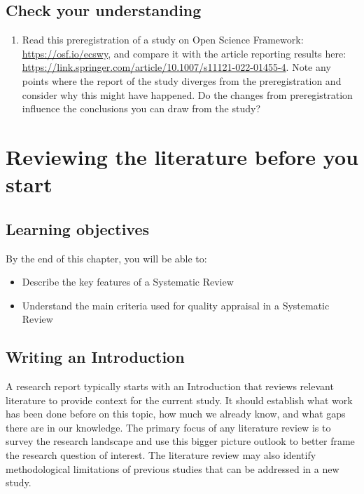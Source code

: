 \documentclass{krantz}
\providecommand{\tightlist}{%
\setlength{\itemsep}{0pt}\setlength{\parskip}{0pt}}
\begin{document}
\hypertarget{check-your-understanding-21}{%
\section{Check your understanding}\label{check-your-understanding-21}}

\begin{enumerate}
\def\labelenumi{\arabic{enumi}.}
\tightlist
\item
  Read this preregistration of a study on Open Science Framework: \url{https://osf.io/ecswy}, and compare it with the article reporting results here: \url{https://link.springer.com/article/10.1007/s11121-022-01455-4}. Note any points where the report of the study diverges from the preregistration and consider why this might have happened. Do the changes from preregistration influence the conclusions you can draw from the study?
\end{enumerate}

\hypertarget{litrev}{%
\chapter{Reviewing the literature before you start}\label{litrev}}

\hypertarget{learning-objectives-21}{%
\section{Learning objectives}\label{learning-objectives-21}}

By the end of this chapter, you will be able to:

\begin{itemize}
\item
  Describe the key features of a Systematic Review
\item
  Understand the main criteria used for quality appraisal in a Systematic Review
\end{itemize}

\hypertarget{writing-an-introduction}{%
\section{Writing an Introduction}\label{writing-an-introduction}}

A research report typically starts with an Introduction that reviews relevant literature to provide context for the current study. It should establish what work has been done before on this topic, how much we already know, and what gaps there are in our knowledge. The primary focus of any literature review is to survey the research landscape and use this bigger picture outlook to better frame the research question of interest. The literature review may also identify methodological limitations of previous studies that can be addressed in a new study.
\end{document}
